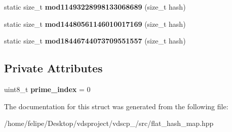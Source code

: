\begin{DoxyCompactItemize}
\item 
static size\+\_\+t {\bfseries mod11493228998133068689} (size\+\_\+t hash)\label{structska_1_1prime__number__hash__policy_a1bba98416d5eef34d57e55597c38b02c}

\item 
static size\+\_\+t {\bfseries mod14480561146010017169} (size\+\_\+t hash)\label{structska_1_1prime__number__hash__policy_afd305ee76b6d6465b0d257c147de8918}

\item 
static size\+\_\+t {\bfseries mod18446744073709551557} (size\+\_\+t hash)\label{structska_1_1prime__number__hash__policy_a8eeabc9b336e9a1705f1d94c1b853f6e}

\end{DoxyCompactItemize}
\subsection*{Private Attributes}
\begin{DoxyCompactItemize}
\item 
uint8\+\_\+t {\bfseries prime\+\_\+index} = 0\label{structska_1_1prime__number__hash__policy_a3d331f8f227d0221eee793b630f3865e}

\end{DoxyCompactItemize}


The documentation for this struct was generated from the following file\+:\begin{DoxyCompactItemize}
\item 
/home/felipe/\+Desktop/vdsproject/vdscp\+\_/src/flat\+\_\+hash\+\_\+map.\+hpp\end{DoxyCompactItemize}
